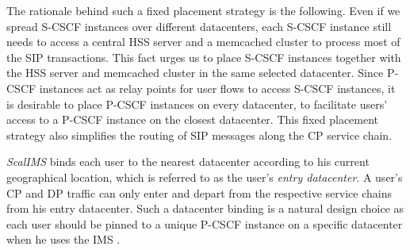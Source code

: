 The rationale behind such a fixed placement strategy is the following. Even if we spread S-CSCF instances over different datacenters, each S-CSCF instance still needs to access a central HSS server and a memcached cluster to process most of the SIP transactions. This fact urges us to place S-CSCF instances together with the HSS server and memcached cluster in the same selected datacenter. Since P-CSCF instances act as relay points for user flows to access S-CSCF instances, it is desirable to place P-CSCF instances on every datacenter, to facilitate users' access to a P-CSCF instance on the closest datacenter. This fixed placement strategy also simplifies the routing of SIP messages along the CP service chain. %


\textit{ScalIMS} binds each user to the nearest datacenter according to his current geographical location, which is referred to as the user's {\em entry datacenter}. A user's CP and DP traffic can only enter and depart from the respective service chains from his entry datacenter. Such a datacenter binding is a natural design choice as each user should be pinned to a unique P-CSCF instance on a specific datacenter when he uses the IMS \cite{3gpp-ims}. %


